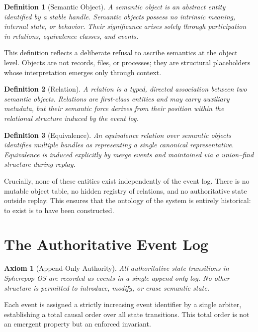 \documentclass[11pt]{article}
\newtheorem{definition}{Definition}[section]
\newtheorem{axiom}{Axiom}[section]
\begin{document}
\begin{definition}[Semantic Object]
A semantic object is an abstract entity identified by a stable handle.
Semantic objects possess no intrinsic meaning, internal state, or behavior.
Their significance arises solely through participation in relations,
equivalence classes, and events.
\end{definition}

This definition reflects a deliberate refusal to ascribe semantics at the
object level. Objects are not records, files, or processes; they are
structural placeholders whose interpretation emerges only through context.

\begin{definition}[Relation]
A relation is a typed, directed association between two semantic objects.
Relations are first-class entities and may carry auxiliary metadata, but
their semantic force derives from their position within the relational
structure induced by the event log.
\end{definition}

\begin{definition}[Equivalence]
An equivalence relation over semantic objects identifies multiple handles as
representing a single canonical representative. Equivalence is induced
explicitly by merge events and maintained via a union--find structure during
replay.
\end{definition}

Crucially, none of these entities exist independently of the event log.
There is no mutable object table, no hidden registry of relations, and no
authoritative state outside replay. This ensures that the ontology of the
system is entirely historical: to exist is to have been constructed.

\section{The Authoritative Event Log}

\begin{axiom}[Append-Only Authority]
All authoritative state transitions in Spherepop OS are recorded as events
in a single append-only log. No other structure is permitted to introduce,
modify, or erase semantic state.
\end{axiom}

Each event is assigned a strictly increasing event identifier by a single
arbiter, establishing a total causal order over all state transitions. This
total order is not an emergent property but an enforced invariant.
\end{document}
